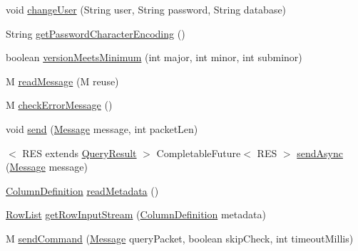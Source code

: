 \begin{DoxyCompactItemize}
void \mbox{\hyperlink{interfacecom_1_1mysql_1_1cj_1_1protocol_1_1_protocol_ae7c8eae149543f5b736a905864b8c1f2}{change\+User}} (String user, String password, String database)
\item 
String \mbox{\hyperlink{interfacecom_1_1mysql_1_1cj_1_1protocol_1_1_protocol_a60c0f5b5a210c088b9bf761e828031b1}{get\+Password\+Character\+Encoding}} ()
\item 
boolean \mbox{\hyperlink{interfacecom_1_1mysql_1_1cj_1_1protocol_1_1_protocol_ace7057295ed6873e77e7998bbf5fa082}{version\+Meets\+Minimum}} (int major, int minor, int subminor)
\item 
M \mbox{\hyperlink{interfacecom_1_1mysql_1_1cj_1_1protocol_1_1_protocol_a5eb63441ad97f1ba2c97b4785c7ca16d}{read\+Message}} (M reuse)
\item 
M \mbox{\hyperlink{interfacecom_1_1mysql_1_1cj_1_1protocol_1_1_protocol_a7176330712bc7aa3ba67261d4a8ef0ca}{check\+Error\+Message}} ()
\item 
void \mbox{\hyperlink{interfacecom_1_1mysql_1_1cj_1_1protocol_1_1_protocol_ae917ec7bc23dc3244bea8e745318c725}{send}} (\mbox{\hyperlink{interfacecom_1_1mysql_1_1cj_1_1protocol_1_1_message}{Message}} message, int packet\+Len)
\item 
$<$ R\+ES extends \mbox{\hyperlink{interfacecom_1_1mysql_1_1cj_1_1_query_result}{Query\+Result}} $>$ Completable\+Future$<$ R\+ES $>$ \mbox{\hyperlink{interfacecom_1_1mysql_1_1cj_1_1protocol_1_1_protocol_aa26c38c00e4f25607756ad93288603df}{send\+Async}} (\mbox{\hyperlink{interfacecom_1_1mysql_1_1cj_1_1protocol_1_1_message}{Message}} message)
\item 
\mbox{\hyperlink{interfacecom_1_1mysql_1_1cj_1_1protocol_1_1_column_definition}{Column\+Definition}} \mbox{\hyperlink{interfacecom_1_1mysql_1_1cj_1_1protocol_1_1_protocol_a65f8a3d80ead4cf22ffe65c539f2f851}{read\+Metadata}} ()
\item 
\mbox{\hyperlink{interfacecom_1_1mysql_1_1cj_1_1result_1_1_row_list}{Row\+List}} \mbox{\hyperlink{interfacecom_1_1mysql_1_1cj_1_1protocol_1_1_protocol_a9e859d7ef531819c5bdef288f650ab83}{get\+Row\+Input\+Stream}} (\mbox{\hyperlink{interfacecom_1_1mysql_1_1cj_1_1protocol_1_1_column_definition}{Column\+Definition}} metadata)
\item 
M \mbox{\hyperlink{interfacecom_1_1mysql_1_1cj_1_1protocol_1_1_protocol_aaef9b7f93e895f19b2f6bc13ec5c2295}{send\+Command}} (\mbox{\hyperlink{interfacecom_1_1mysql_1_1cj_1_1protocol_1_1_message}{Message}} query\+Packet, boolean skip\+Check, int timeout\+Millis)
\item 

\end{DoxyCompactItemize}

